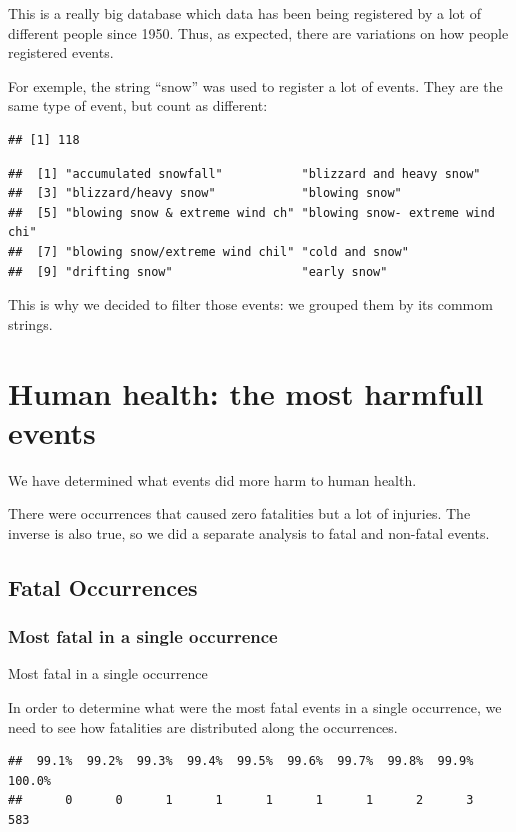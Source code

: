 \documentclass[]{article}
\begin{document}
This is a really big database which data has been being registered by a
lot of different people since 1950. Thus, as expected, there are
variations on how people registered events.

For exemple, the string ``snow'' was used to register a lot of events.
They are the same type of event, but count as different:

\begin{verbatim}
## [1] 118
\end{verbatim}

\begin{verbatim}
##  [1] "accumulated snowfall"           "blizzard and heavy snow"       
##  [3] "blizzard/heavy snow"            "blowing snow"                  
##  [5] "blowing snow & extreme wind ch" "blowing snow- extreme wind chi"
##  [7] "blowing snow/extreme wind chil" "cold and snow"                 
##  [9] "drifting snow"                  "early snow"
\end{verbatim}

This is why we decided to filter those events: we grouped them by its
commom strings.

\section{Human health: the most harmfull
events}\label{human-health-the-most-harmfull-events}

We have determined what events did more harm to human health.

There were occurrences that caused zero fatalities but a lot of
injuries. The inverse is also true, so we did a separate analysis to
fatal and non-fatal events.

\subsection{Fatal Occurrences}\label{fatal-occurrences}

\subsubsection{Most fatal in a single
occurrence}\label{most-fatal-in-a-single-occurrence}

Most fatal in a single occurrence

In order to determine what were the most fatal events in a single
occurrence, we need to see how fatalities are distributed along the
occurrences.

\begin{verbatim}
##  99.1%  99.2%  99.3%  99.4%  99.5%  99.6%  99.7%  99.8%  99.9% 100.0% 
##      0      0      1      1      1      1      1      2      3    583
\end{verbatim}
\end{document}
